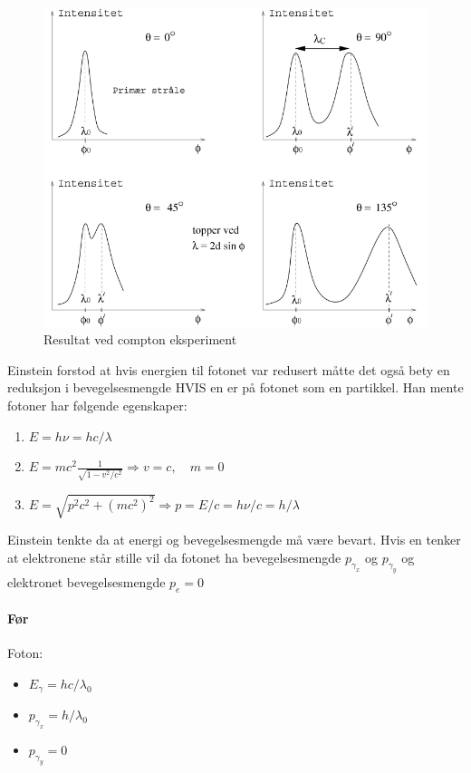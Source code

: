 \begin{figure}[h!]
  \centering
  \includegraphics[scale = .5]{Figures/Compton resultater.png}
  \caption{Resultat ved compton eksperiment}
  \label{fig: Compton resultater}
\end{figure}

Einstein forstod at hvis energien til fotonet var redusert måtte det også bety en reduksjon i bevegelsesmengde HVIS en er på fotonet som en partikkel. Han mente fotoner har følgende egenskaper: 
\begin{enumerate}
    \item $E = hν = h c / λ$
    \item $E = mc^2 \frac{1}{\sqrt{1 - v^{2} / c^{2}}} ⇒ v = c, \quad m = 0$
    \item $E = \sqrt{p^{2} c^{2} +(mc^{2})^{2}} ⇒ p = E /c = hν / c = h /λ$
\end{enumerate}
Einstein tenkte da at energi og bevegelsesmengde må være bevart. Hvis en tenker at elektronene står stille vil da fotonet ha bevegelsesmengde $p_{γ_{x}}$ og $p_{γ_{y}}$ og elektronet bevegelsesmengde $p_{e} = 0$ 




\paragraph*{Før}
Foton: 
\begin{itemize}
    \item $E_{γ} = h c / λ_0$
    \item $p_{γ_{x}} = h / λ_0$
    \item $p_{γ_{y}} = 0$  
\end{itemize}

